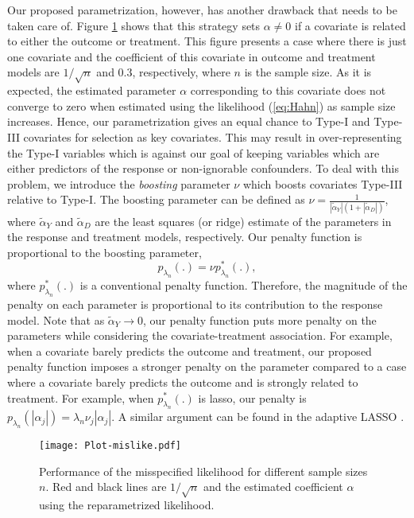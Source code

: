 \documentclass[11pt]{statsoc}
\begin{document}
Our proposed parametrization, however, has another drawback that needs to be taken care of. Figure \ref{fig:mislike-perf} shows that this strategy sets $\alpha \neq 0$ if a covariate is related to either the outcome or treatment. This figure presents a case where there is just one covariate and the coefficient of this covariate in outcome and treatment models are $1/\sqrt n$ and $0.3$, respectively, where $n$ is the sample size. As it is expected, the estimated parameter $\alpha$ corresponding to this covariate does not converge to zero when estimated using the likelihood (\ref{eq:Hahn}) as sample size increases.  Hence, our parametrization gives an equal chance to Type-I and Type-III covariates for selection as key covariates. This may result in over-representing the Type-I variables which is against our goal of keeping variables which are either predictors of the response or non-ignorable confounders. To deal with this problem, we introduce the {\it boosting} parameter $\nu$ which boosts covariates Type-III relative to Type-I. The boosting parameter can be defined as $\nu= \frac{1}{| \tilde \alpha_Y|(1+| \tilde \alpha_D|)}$, where $\tilde \alpha_Y$ and $\tilde \alpha_D$ are the least squares (or ridge) estimate of the parameters in the response and treatment models, respectively. Our
penalty function is proportional to the boosting parameter,
$$p_{\lambda_n}(.)=\nu p_{\lambda_n}^*(.), $$ where $p_{\lambda_n}^*(.)$ is a
conventional penalty function. Therefore, the magnitude of the penalty on each
parameter is proportional to its contribution to the response
model.  Note that as $\tilde \alpha_Y \rightarrow 0$, our penalty function puts more penalty on  the parameters while considering the covariate-treatment association. For example, when a covariate barely predicts the outcome and treatment, our proposed penalty function imposes a stronger penalty on the parameter compared to a case where a covariate barely predicts the outcome and is strongly related to treatment.  For example, when $p_{\lambda_n}^*(.) $ is lasso, our penalty is $p_{\lambda_n}(|\alpha_j|)= \lambda_n \nu_j |\alpha_j| $.
A similar argument can be found in the adaptive LASSO \citep{zou2006adaptive}. 

\begin{figure}[t]
\centering
\texttt{[image: Plot-mislike.pdf]}
\caption{{Performance of the misspecified likelihood for different sample sizes $n$. Red and black  lines are $1/\sqrt n$ and the estimated coefficient $\alpha$ using the reparametrized likelihood.  }} 
\label{fig:mislike-perf}
\end{figure} 
\end{document}
